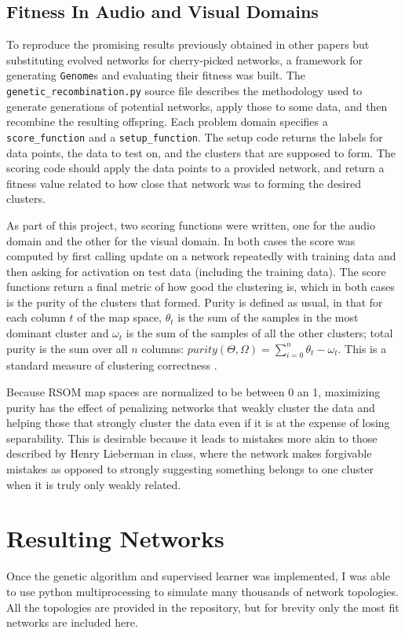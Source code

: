 \documentclass[12pt,a4paper]{article}
\begin{document}
\subsection{Fitness In Audio and Visual Domains}
To reproduce the promising results previously obtained in other papers but substituting evolved networks for cherry-picked networks, a framework for generating \texttt{Genome}s and evaluating their fitness was built.  The \texttt{genetic\_recombination.py} source file describes the methodology used to generate generations of potential networks, apply those to some data, and then recombine the resulting offspring.  Each problem domain specifies a \texttt{score\_function} and a \texttt{setup\_function}.  The setup code returns the labels for data points, the data to test on, and the clusters that are supposed to form.  The scoring code should apply the data points to a provided network, and return a fitness value related to how close that network was to forming the desired clusters.

As part of this project, two scoring functions were written, one for the audio domain and the other for the visual domain.  In both cases the score was computed by first calling update on a network repeatedly with training data and then asking for activation on test data (including the training data).  The score functions return a final metric of how good the clustering is, which in both cases is the purity of the clusters that formed.  Purity is defined as usual, in that for each column $t$ of the map space, $\theta_t$ is the sum of the samples in the most dominant cluster and $\omega_t$ is the sum of the samples of all the other clusters; total purity is the sum over all $n$ columns: $purity(\Theta, \Omega) = \sum_{i=0}^n{\theta_t - \omega_t}$.  This is a standard measure of clustering correctness \cite{Purity}.

Because RSOM map spaces are normalized to be between 0 an 1, maximizing purity has the effect of penalizing networks that weakly cluster the data and helping those that strongly cluster the data even if it is at the expense of losing separability.  This is desirable because it leads to mistakes more akin to those described by Henry Lieberman in class, where the network makes forgivable mistakes as opposed to strongly suggesting something belongs to one cluster when it is truly only weakly related.

\section{Resulting Networks}
Once the genetic algorithm and supervised learner was implemented, I was able to use python multiprocessing to simulate many thousands of network topologies.  All the topologies are provided in the repository, but for brevity only the most fit networks are included here.
\end{document}
